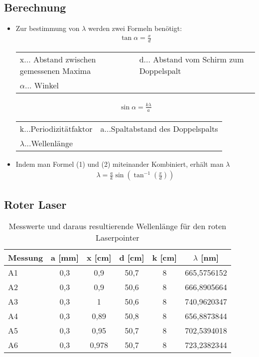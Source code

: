 \subsection{Berechnung}
\begin{itemize}
	\item Zur bestimmung von $\lambda$ werden zwei Formeln benötigt:
	      \begin{align}
		      \tan \alpha = \frac{x} {d}
	      \end{align}
	      \begin{tabular}{ll}
		      x... Abstand zwischen gemessenen Maxima & d... Abstand vom Schirm zum Doppelspalt \\
		      $\alpha$... Winkel                      &
	      \end{tabular}
	      \begin{align}
		      \sin \alpha = \frac{k\lambda}{a}
	      \end{align}
	      \begin{tabular}{ll}
		      k...Periodizitätfaktor  & a...Spaltabstand des Doppelspalts \\
		      $\lambda$...Wellenlänge &
	      \end{tabular}
	\item Indem man Formel (1) und (2) miteinander Kombiniert, erhält man $\lambda$
	      \begin{align*}
		      \lambda = \frac{a}{k}\sin (\tan^{-1} (\frac{x}{d}))
	      \end{align*}
\end{itemize}
\subsection{Roter Laser}
\begin{table}[H]
	\centering
	\begin{tabular}{lccccc}
		\toprule
		Messung & a [mm] & x [cm] & d [cm] & k [cm] & $\lambda$ [nm] \\
		\midrule
		A1      & 0,3    & 0,9    & 50,7   & 8      & 665,5756152    \\
		A2      & 0,3    & 0,9    & 50,6   & 8      & 666,8905664    \\
		A3      & 0,3    & 1      & 50,6   & 8      & 740,9620347    \\
		A4      & 0,3    & 0,89   & 50,8   & 8      & 656,8873844    \\
		A5      & 0,3    & 0,95   & 50,7   & 8      & 702,5394018    \\
		A6      & 0,3    & 0,978  & 50,7   & 8      & 723,2382344    \\
		\bottomrule
	\end{tabular}
	\caption{Messwerte und daraus resultierende Wellenlänge für den roten Laserpointer}
\end{table}


